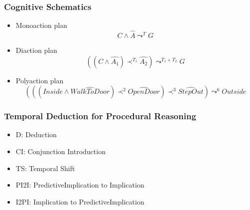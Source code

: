 \documentclass[aspectratio=169]{beamer}
\begin{document}
\begin{frame}
  \frametitle{Cognitive Schematics}

  \begin{itemize}
  \item<+-> Monoaction plan
    $$C \wedge \widehat{A} \leadsto^{T} G$$
  \item<+-> Diaction plan
    $$\left( (C \wedge \widehat{A_1} ) \prec^{T_1} \widehat{A_2} \right) \leadsto^{T_1+T_2} G$$
  \item<+-> Polyaction plan
    $$\left( \left( \left( Inside \wedge \widehat{WalkToDoor}\right) \prec^{2}
    \widehat{OpenDoor}\right) \prec^{3} \widehat{StepOut}\right) \leadsto^{6} Outside$$
  \end{itemize}

\end{frame}

\begin{frame}
  \frametitle{Temporal Deduction for Procedural Reasoning}
  {\tiny
    \begin{prooftree}
    \end{prooftree}}

  \begin{itemize}
  \item D: Deduction
  \item CI: Conjunction Introduction
  \item TS: Temporal Shift
  \item PI2I: PredictiveImplication to Implication
  \item I2PI: Implication to PredictiveImplication
  \end{itemize}

\end{frame}
\end{document}
